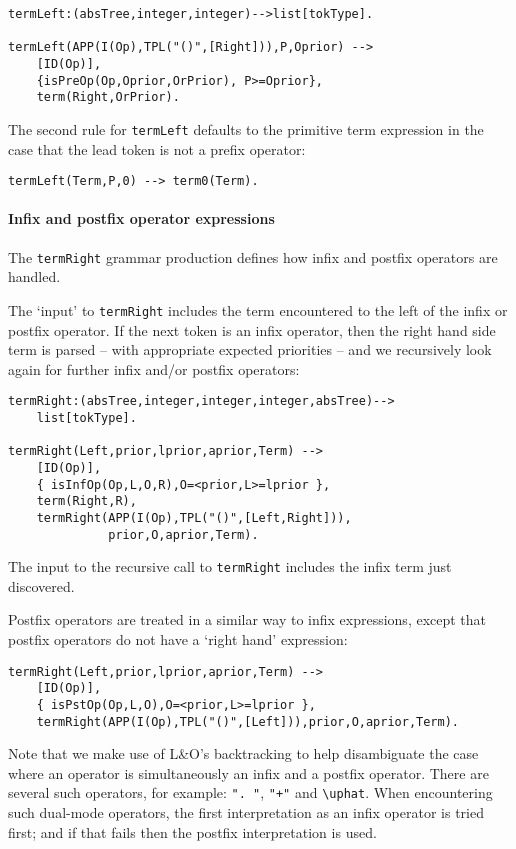 \begin{verbatim}
termLeft:(absTree,integer,integer)-->list[tokType].

termLeft(APP(I(Op),TPL("()",[Right])),P,Oprior) -->
    [ID(Op)],
    {isPreOp(Op,Oprior,OrPrior), P>=Oprior},
    term(Right,OrPrior).
\end{verbatim}
      
The second rule for \verb+termLeft+ defaults to the primitive term expression in the case that the lead token is not a prefix operator:

\begin{verbatim}
termLeft(Term,P,0) --> term0(Term).
\end{verbatim}

\paragraph{Infix and postfix operator expressions}
The \verb+termRight+ grammar production defines how infix and postfix operators are handled.

The `input' to \verb+termRight+ includes the term encountered to the left of the infix or postfix operator. If the next token is an infix operator, then the right hand side term is parsed -- with appropriate expected priorities -- and we recursively look again for further infix and/or postfix operators:
\begin{verbatim}
termRight:(absTree,integer,integer,integer,absTree)-->
    list[tokType].

termRight(Left,prior,lprior,aprior,Term) -->
    [ID(Op)],
    { isInfOp(Op,L,O,R),O=<prior,L>=lprior },
    term(Right,R),
    termRight(APP(I(Op),TPL("()",[Left,Right])),
	          prior,O,aprior,Term).
\end{verbatim}
The input to the recursive call to \verb+termRight+ includes the infix term just discovered. 

Postfix operators are treated in a similar way to infix expressions, except that postfix operators do not have a `right hand' expression:
\begin{verbatim}
termRight(Left,prior,lprior,aprior,Term) -->
    [ID(Op)],
    { isPstOp(Op,L,O),O=<prior,L>=lprior },
    termRight(APP(I(Op),TPL("()",[Left])),prior,O,aprior,Term).
\end{verbatim}
Note that we make use of L&O's backtracking to help disambiguate the case where an operator is simultaneously an infix and a postfix operator. There are several such operators, for example: \verb+". "+, \verb!"+"! and \verb+\uphat+. When encountering such dual-mode operators, the first interpretation as an infix operator is tried first; and if that fails then the postfix interpretation is used.

